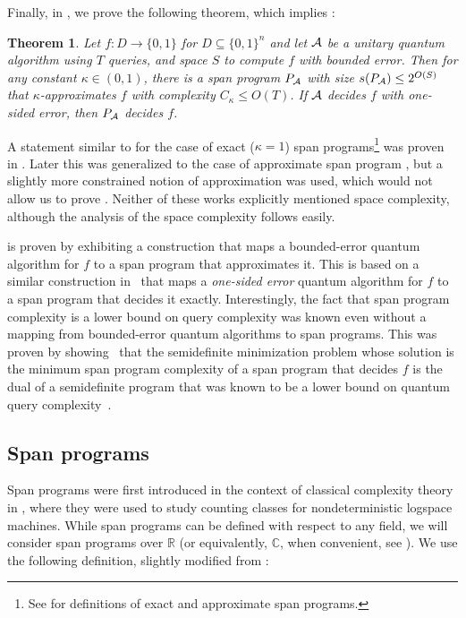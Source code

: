 \documentclass[11pt]{article}
\numberwithin{equation}{section}
\newtheorem{theorem}{Theorem}[section]
\theoremstyle{definition}
\theoremstyle{plain}
\newcommand{\C}{\mathbb C}
\newcommand{\R}{\mathbb R}
\begin{document}
Finally, in , we prove the following theorem, which implies :
\begin{theorem}\label{thm:alg-to-span}
Let $f:D\rightarrow \{0,1\}$ for $D\subseteq \{0,1\}^n$ and let ${\cal A}$ be a unitary quantum algorithm using $T$ queries, and space $S$ to compute $f$ with bounded error. Then for any constant $\kappa\in (0,1)$, there is a span program $P_{\cal A}$ with size $s(P_{\cal A})\leq 2^{O(S)}$ that $\kappa$-approximates $f$ with complexity $C_{\kappa}\leq O(T)$. If $\cal A$ decides $f$ with one-sided error, then $P_{\cal A}$ decides $f$. 
\end{theorem}

%
A statement similar   %
to  for the case of exact ($\kappa=1$) span programs\footnote{See  for definitions of exact and approximate span programs.} was proven in \cite{Rei09}. Later this was generalized to the case of approximate span program \cite{IJ15}, but a slightly more constrained notion of approximation was used, which would not allow us to prove . Neither of these works explicitly mentioned space complexity, although the analysis of the space complexity follows easily. 

 is proven by exhibiting a construction that maps a bounded-error quantum algorithm for $f$ to a span program that approximates it. This is based on a similar construction in~\cite{Rei09} that maps a \emph{one-sided error} quantum algorithm for $f$ to a span program that decides it exactly. Interestingly, the fact that span program complexity is a lower bound on query complexity was known even without a mapping from bounded-error quantum algorithms to span programs. This was proven by showing~\cite{Rei09} that the semidefinite minimization problem whose solution is the minimum span program complexity of a span program that decides $f$ is the dual of a semidefinite program that was known to be a lower bound on quantum query complexity~\cite{amb00,BSS03,HLS07}.   




\subsection{Span programs}\label{sec:span}

Span programs were first introduced in the context of classical complexity theory in \cite{KW93}, where they were used to study counting classes for nondeterministic logspace machines. While span programs can be defined with respect to any field, we will consider span programs over $\R$ (or equivalently, $\C$, when convenient, see ).
We use the following definition, slightly modified from \cite{KW93}:
\end{document}
